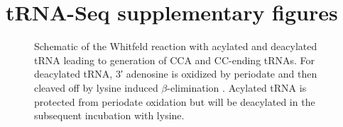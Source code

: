 \chapter{tRNA-Seq supplementary figures}


\begin{figure}[ht]
    \centering
    \caption[Whitfeld reaction scheme.]{
    Schematic of the Whitfeld reaction with acylated and deacylated tRNA leading to generation of CCA and CC-ending tRNAs.
    For deacylated tRNA, 3′ adenosine is oxidized by periodate and then cleaved off by lysine induced $\beta$-elimination \cite{Rammler1971-mt, uziel1973periodate}.
    Acylated tRNA is protected from periodate oxidation but will be deacylated in the subsequent incubation with lysine.
    }
    \label{ch5:figsupp:f1S1}
\end{figure}


